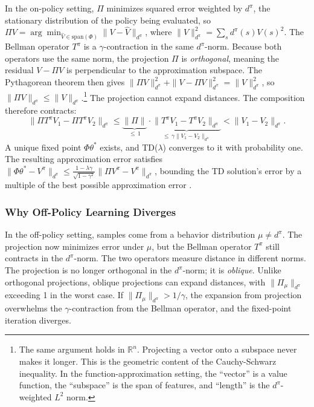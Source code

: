 In the on-policy setting, $\Pi$ minimizes squared error weighted by $d^\pi$, the stationary distribution of the policy being evaluated, so $\Pi V = \arg\min_{\hat{V} \in \text{span}(\Phi)} \|V - \hat{V}\|_{d^\pi}$, where $\|V\|_{d^\pi}^2 = \sum_s d^\pi(s) V(s)^2$. The Bellman operator $T^\pi$ is a $\gamma$-contraction in the same $d^\pi$-norm. Because both operators use the same norm, the projection $\Pi$ is \emph{orthogonal}, meaning the residual $V - \Pi V$ is perpendicular to the approximation subspace. The Pythagorean theorem then gives $\|\Pi V\|_{d^\pi}^2 + \|V - \Pi V\|_{d^\pi}^2 = \|V\|_{d^\pi}^2$, so $\|\Pi V\|_{d^\pi} \leq \|V\|_{d^\pi}$.\footnote{The same argument holds in $\mathbb{R}^n$. Projecting a vector onto a subspace never makes it longer. This is the geometric content of the Cauchy-Schwarz inequality. In the function-approximation setting, the ``vector'' is a value function, the ``subspace'' is the span of features, and ``length'' is the $d^\pi$-weighted $L^2$ norm.} The projection cannot expand distances. The composition therefore contracts:
\begin{equation}
\|\Pi T^\pi V_1 - \Pi T^\pi V_2\|_{d^\pi} \leq \underbrace{\|\Pi\|}_{\leq\, 1} \cdot \underbrace{\|T^\pi V_1 - T^\pi V_2\|_{d^\pi}}_{\leq\, \gamma \|V_1 - V_2\|_{d^\pi}} < \|V_1 - V_2\|_{d^\pi}.
\label{eq:on_policy_contraction}
\end{equation}
A unique fixed point $\Phi \theta^*$ exists, and TD($\lambda$) converges to it with probability one. The resulting approximation error satisfies $\|\Phi \theta^* - V^\pi\|_{d^\pi} \leq \frac{1-\lambda\gamma}{\sqrt{1-\gamma^2}} \|\Pi V^\pi - V^\pi\|_{d^\pi}$, bounding the TD solution's error by a multiple of the best possible approximation error \citep[Theorem~1]{tsitsiklis1997}.

\subsubsection{Why Off-Policy Learning Diverges}

In the off-policy setting, samples come from a behavior distribution $\mu \neq d^\pi$. The projection now minimizes error under $\mu$, but the Bellman operator $T^\pi$ still contracts in the $d^\pi$-norm. The two operators measure distance in different norms. The projection is no longer orthogonal in the $d^\pi$-norm; it is \emph{oblique}. Unlike orthogonal projections, oblique projections can expand distances, with $\|\Pi_\mu\|_{d^\pi}$ exceeding 1 in the worst case. If $\|\Pi_\mu\|_{d^\pi} > 1/\gamma$, the expansion from projection overwhelms the $\gamma$-contraction from the Bellman operator, and the fixed-point iteration diverges.

